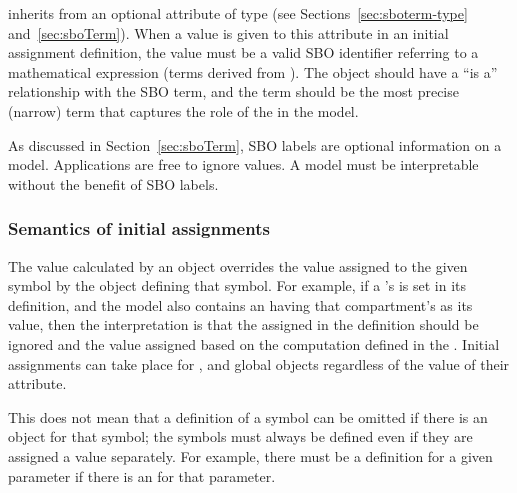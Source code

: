 \InitialAssignment inherits from \SBase an optional  attribute of type
 (see Sections~\ref{sec:sboterm-type}
and~\ref{sec:sboTerm}).  When a value is given to this attribute in an
initial assignment definition, the value must be a valid SBO
identifier referring to a mathematical expression (\ie terms
derived from \sbomathformula).  The \InitialAssignment object
should have a ``is a'' relationship with the SBO term, and the
term should be the most precise (narrow) term that captures the
role of the \InitialAssignment in the model.

As discussed in Section~\ref{sec:sboTerm}, SBO labels are optional
information on a model.  Applications are free to ignore
 values.  A model must be interpretable without the
benefit of SBO labels.


\subsubsection{Semantics of initial assignments}
\label{sec:initial-assignment-semantics}

The value calculated by an \InitialAssignment object overrides the
value assigned to the given symbol by the object defining that
symbol.  For example, if a \Compartment's  is set in
its definition, and the model also contains an \InitialAssignment
having that compartment's  as its  value,
then the interpretation is that the  assigned in the
\Compartment definition should be ignored and the value assigned
based on the computation defined in the \InitialAssignment.
Initial assignments can take place for \Compartment, \Species and
global \Parameter objects regardless of the value of their
 attribute.

This does not mean that a definition of a symbol can be omitted if
there is an \InitialAssignment object for that symbol; the symbols
must always be defined even if they are assigned a value
separately.  For example, there must be a \Parameter definition
for a given parameter if there is an \InitialAssignment for that
parameter.

